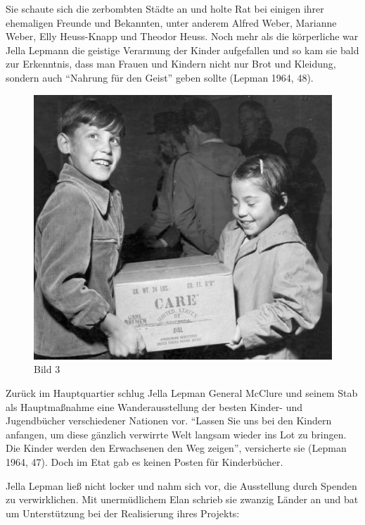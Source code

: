 \documentclass[a4paper,
fontsize=11pt,
oneside,
numbers=noperiodatend,
parskip=half-,
bibliography=totoc,
final
]{scrartcl}
\begin{document}
Sie schaute sich die zerbombten Städte an und holte Rat bei einigen
ihrer ehemaligen Freunde und Bekannten, unter anderem Alfred Weber,
Marianne Weber, Elly Heuss-Knapp und Theodor Heuss. Noch mehr als die
körperliche war Jella Lepmann die geistige Verarmung der Kinder
aufgefallen und so kam sie bald zur Erkenntnis, dass man Frauen und
Kindern nicht nur Brot und Kleidung, sondern auch \enquote{Nahrung für
den Geist} geben sollte (Lepman 1964, 48).~

\begin{figure}[htbp]
\centering
\includegraphics{img/Bild3.jpg}
\caption{Bild 3}
\end{figure}

Zurück im Hauptquartier schlug Jella Lepman General McClure und seinem
Stab als Hauptmaßnahme eine Wanderausstellung der besten Kinder- und
Jugendbücher verschiedener Nationen vor. \enquote{Lassen Sie uns bei den
Kindern anfangen, um diese gänzlich verwirrte Welt langsam wieder ins
Lot zu bringen. Die Kinder werden den Erwachsenen den Weg zeigen},
versicherte sie (Lepman 1964, 47). Doch im Etat gab es keinen Posten für
Kinderbücher.

Jella Lepman ließ nicht locker und nahm sich vor, die Ausstellung durch
Spenden zu verwirklichen. Mit unermüdlichem Elan schrieb sie zwanzig
Länder an und bat um Unterstützung bei der Realisierung ihres Projekts:
\end{document}
